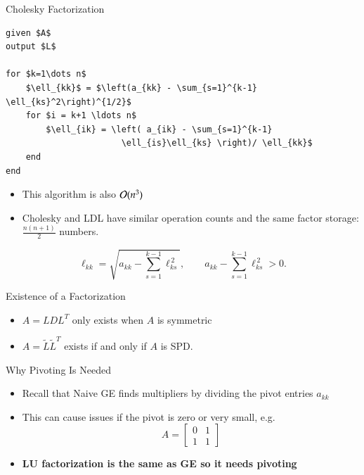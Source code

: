 \documentclass[10pt]{beamer}
\begin{document}
\begin{frame}[fragile]{Cholesky Factorization}
\begin{lstlisting}[mathescape,label=algo:chol]
given $A$
output $L$
                           
for $k=1\dots n$          
    $\ell_{kk}$ = $\left(a_{kk} - \sum_{s=1}^{k-1} \ell_{ks}^2\right)^{1/2}$
    for $i = k+1 \ldots n$      
        $\ell_{ik} = \left( a_{ik} - \sum_{s=1}^{k-1}
                       \ell_{is}\ell_{ks} \right)/ \ell_{kk}$
    end
end                          
\end{lstlisting}
\begin{itemize}
    \item This algorithm is also ${\mathcal{O}}(n^3)$
    \item Cholesky and LDL have similar operation counts and
the same factor storage: $\frac{n(n+1)}{2}$ numbers.
\end{itemize} 
\[
\ell_{kk}
=
\sqrt{a_{kk}-\sum_{s=1}^{k-1}\ell_{ks}^{\,2}},
\qquad
a_{kk}-\sum_{s=1}^{k-1}\ell_{ks}^{\,2}>0.
\]
\end{frame}




\begin{frame}{Existence of a Factorization}


\begin{itemize}
    \item $A=LDL^T$ only exists when $A$ is symmetric
        \vfill 
\item $A=\widetilde L\widetilde L^T$ exists if and only if
$A$ is SPD.
\end{itemize}
\vfill 
{}
    \vfill 
\end{frame}


\begin{frame}{Why Pivoting Is Needed}
\begin{itemize}
    \item Recall that Naive GE finds multipliers by dividing the pivot entries $a_{kk}$
    \vfill
    \item This can cause issues if the pivot is zero or very small, e.g. 
\[
A =
\begin{bmatrix}
\boxed{0} & 1\\
1 & 1
\end{bmatrix}
\]
    \item \textbf{LU factorization is the same as GE so it needs pivoting}

\vfill
\end{itemize}
\end{frame}
\end{document}
